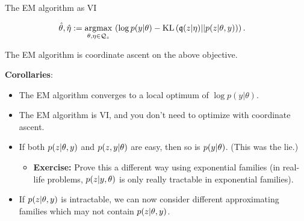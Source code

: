 \begin{frame}{The EM algorithm as VI}

\begin{align*}
%
\thetahat, \etaopt :={}& \argmax{\theta, \eta \in \qdom_z} \left(
\log p(\y | \theta) -
    \kl{\q(\z | \eta)}{p(\z | \theta, \y)}  \right).
%
\end{align*}
%

The EM algorithm is coordinate ascent on the above objective.

\textbf{Corollaries}:

\begin{itemize}
%
\item<2-> The EM algorithm converges to a local optimum of $\log p(y | \theta)$.
%
\item<3-> The EM algorithm is VI, and you don't need to optimize with coordinate
ascent.
%
\item<4-> If both $p(z | \theta, y)$ and $p(z, y | \theta )$ are easy,
then so is $p(y | \theta)$.  (This was the lie.)
\begin{itemize}
    \item<5-> \textbf{Exercise: } Prove this a different way using exponential
    families (in real-life problems, $p(z | y, \theta)$ is only
    really tractable in exponential families).
\end{itemize}
%
\item<6-> If $p(z | \theta, y)$ is intractable, we can now consider different
approximating families which may not contain $p(z | \theta, y)$.
%
\end{itemize}

\end{frame}



